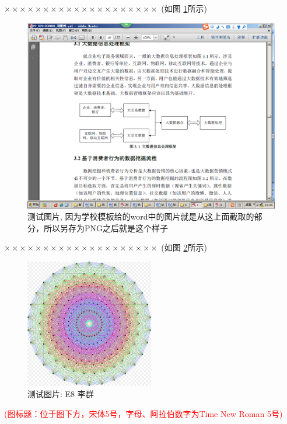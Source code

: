 \documentclass[11pt,a4paper]{article}
\theoremstyle{definition} \newtheorem{law}[thm]{Law}
\theoremstyle{plain} \newtheorem{jury}[thm]{Jury}
\theoremstyle{remark} \newtheorem*{marg}{Margaret}
\newcommand{\reffig}[1]{图 \ref{#1}}
\numberwithin{equation}{section}
\begin{document}
$ \times\times\times\times\times\times\times\times\times\times\times\times\times\times\times\times\times\times\times\times $  (如\reffig{testfig}所示)
\begin{figure}[htbp]
	\centering
	\includegraphics[width=\textwidth]{testmindmap}
	\caption{测试图片, 因为学校模板给的word中的图片就是从这上面截取的部分，所以另存为PNG之后就是这个样子}
	\label{testfig}
\end{figure}

$ \times\times\times\times\times\times\times\times\times\times\times\times\times\times\times\times\times\times\times\times $  (如\reffig{E8}所示)

\begin{figure}[htbp]
	\centering
	\includegraphics[width=0.5\textwidth]{E8Petrie}
	\caption{测试图片: E8 李群}
	\label{E8}
\end{figure}

\textcolor{red}{(图标题：位于图下方，宋体5号，字母、阿拉伯数字为Time New Roman 5号)}
\end{document}
